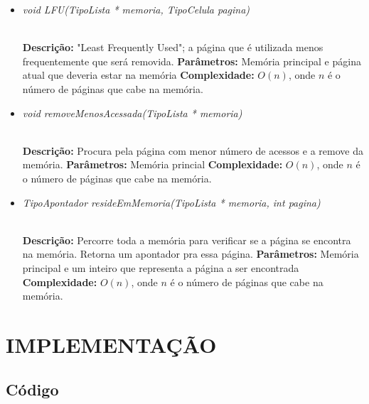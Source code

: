 \documentclass[12pt]{article}
\begin{document}
\begin{itemize}
 \item \begin{large}\textit{void LFU(TipoLista * memoria, TipoCelula pagina)}\end{large}\\
 \subitem \textbf{Descrição:} "Least Frequently Used"; a página que é utilizada menos frequentemente que será removida.
 \subitem \textbf{Parâmetros:} Memória principal e página atual que deveria estar na memória
 \subitem \textbf{Complexidade:} $O(n)$, onde $n$ é o número de páginas que cabe na memória.
\end{itemize}

\vspace{0.2 true cm}

\begin{itemize}
 \item \begin{large}\textit{void removeMenosAcessada(TipoLista * memoria)}\end{large}\\
 \subitem \textbf{Descrição:} Procura pela página com menor número de acessos e a remove da memória.
 \subitem \textbf{Parâmetros:} Memória princial
 \subitem \textbf{Complexidade:} $O(n)$, onde $n$ é o número de páginas que cabe na memória.
\end{itemize}

\vspace{0.2 true cm}

\begin{itemize}
 \item \begin{large}\textit{TipoApontador resideEmMemoria(TipoLista * memoria, int pagina)}\end{large}\\
 \subitem \textbf{Descrição:} Percorre toda a memória para verificar se a página se encontra na memória. Retorna um apontador pra essa página.
 \subitem \textbf{Parâmetros:} Memória principal e um inteiro que representa a página a ser encontrada
 \subitem \textbf{Complexidade:} $O(n)$, onde $n$ é o número de páginas que cabe na memória.
\end{itemize}


\section{IMPLEMENTAÇÃO}
\label{implementacao}

\subsection{Código}
\end{document}

